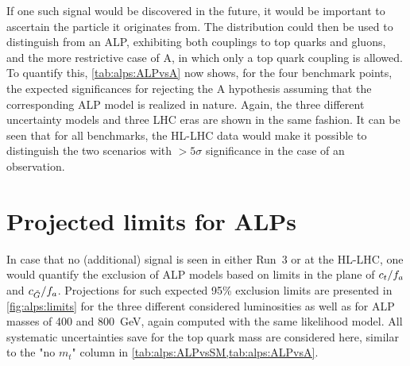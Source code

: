 If one such signal would be discovered in the future, it would be important to ascertain the particle it originates from. The \mtt distribution could then be used to distinguish from an ALP, exhibiting both couplings to top quarks and gluons, and the more restrictive case of A, in which only a top quark coupling is allowed. To quantify this, \cref{tab:alps:ALPvsA} now shows, for the four benchmark points, the expected significances for rejecting the A hypothesis assuming that the corresponding ALP model is realized in nature. Again, the three different uncertainty models and three LHC eras are shown in the same fashion. It can be seen that for all benchmarks, the HL-LHC data would make it possible to distinguish the two scenarios with $>5\sigma$ significance in the case of an observation.

\section{Projected limits for ALPs}
\label{sec:alps:limits}

In case that no (additional) signal is seen in either Run~3 or at the HL-LHC, one would quantify the exclusion of ALP models based on limits in the plane of $c_t/f_a$ and $c_{\tilde{G}}/f_a$. Projections for such expected 95\% exclusion limits are presented in \cref{fig:alps:limits} for the three different considered luminosities as well as for ALP masses of 400 and 800~GeV, again computed with the same likelihood model. All systematic uncertainties save for the top quark mass are considered here, similar to the "no $m_t$" column in \cref{tab:alps:ALPvsSM,tab:alps:ALPvsA}.

